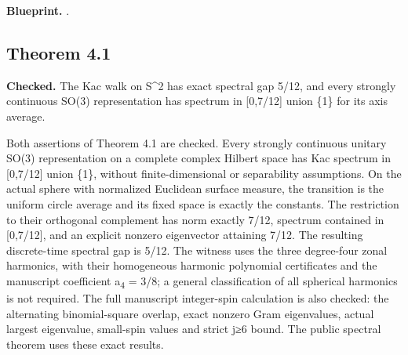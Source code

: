 \textbf{Blueprint.} .

\subsection{Theorem 4.1}\label{paper:r4-1}
\textbf{Checked.} The Kac walk on S\textasciicircum{}2 has exact spectral gap 5/12, and every strongly continuous SO(3) representation has spectrum in [0,7/12] union \{1\} for its axis average. 

Both assertions of Theorem 4.1 are checked. Every strongly continuous unitary SO(3) representation on a complete complex Hilbert space has Kac spectrum in [0,7/12] union \{1\}, without finite-dimensional or separability assumptions. On the actual sphere with normalized Euclidean surface measure, the transition is the uniform circle average and its fixed space is exactly the constants. The restriction to their orthogonal complement has norm exactly 7/12, spectrum contained in [0,7/12], and an explicit nonzero eigenvector attaining 7/12. The resulting discrete-time spectral gap is 5/12. The witness uses the three degree-four zonal harmonics, with their homogeneous harmonic polynomial certificates and the manuscript coefficient a\textsubscript{4} = 3/8; a general classification of all spherical harmonics is not required. The full manuscript integer-spin calculation is also checked: the alternating binomial-square overlap, exact nonzero Gram eigenvalues, actual largest eigenvalue, small-spin values and strict j≥6 bound. The public spectral theorem uses these exact results.

